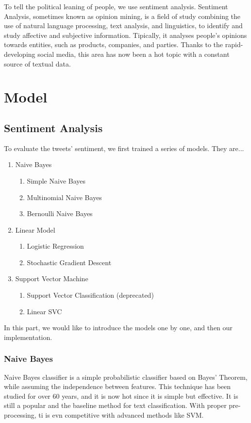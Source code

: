 \documentclass[12pt,a4paper]{article}
\begin{document}
  To tell the political leaning of people, we use sentiment analysis. Sentiment Analysis, sometimes known as opinion mining, is a field of study combining the use of natural language processing, text analysis, and linguistics, to identify and study affective and subjective information. Tipically, it analyses people’s opinions towards entities, such as products, companies, and parties. Thanks to the rapid-developing social media, this area has now been a hot topic with a constant source of textual data.



\section{Model}

\subsection{Sentiment Analysis}

  To evaluate the tweets' sentiment, we first trained a series of models. They are...

  \begin{enumerate}
    \item Naive Bayes
      \begin{enumerate} 
        \item Simple Naive Bayes
        \item Multinomial Naive Bayes
        \item Bernoulli Naive Bayes
      \end{enumerate}
    \item Linear Model
      \begin{enumerate} 
        \item Logistic Regression
        \item Stochastic Gradient Descent
      \end{enumerate}
    \item Support Vector Machine
      \begin{enumerate} 
        \item Support Vector Classification (deprecated)
        \item Linear SVC
      \end{enumerate}
  \end{enumerate}

  In this part, we would like to introduce the models one by one, and then our implementation.

  \subsubsection{Naive Bayes}
    Naive Bayes classifier is a simple probabilistic classifier based on Bayes' Theorem, while assuming the independence between features. This technique has been studied for over 60 years, and it is now hot since it is simple but effective. It is still a popular and the baseline method for text classification. With proper pre-processing, ti is evn competitive with advanced methods like SVM.
    
\end{document}
